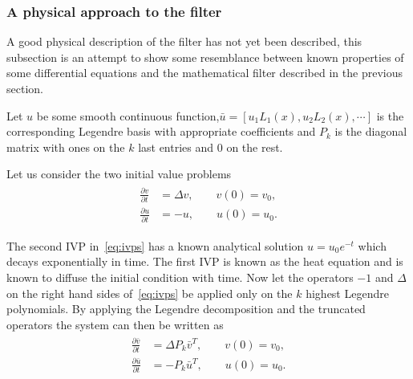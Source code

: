\subsubsection{A physical approach to the filter}
A good physical description of the filter has not yet been described, this 
subsection is an attempt to show some resemblance between known properties 
of some differential equations and the mathematical filter described in the previous section.

Let $u$ be some smooth continuous function,$\bar u = [u_1L_1(x),u_2L_2(x), \cdots]$
is the corresponding Legendre basis with 
appropriate coefficients
and $P_{k}$ is the diagonal matrix with ones on the $k$ last entries and $0$ on the rest.

Let us consider the two initial value problems 
\begin{align}
    \begin{split}
    \frac{\partial v }{\partial t} &= \Delta v, \qquad v(0) = v_0, \\
    \frac{\partial u }{\partial t} &= -u, \qquad u(0) = u_0.
    \end{split}
    \label{eq:ivps}
\end{align}

The second IVP in~\ref{eq:ivps} has a known analytical solution 
$u = u_0e^{-t}$ which decays exponentially in time. The first IVP is known 
as the heat equation and is known to diffuse the initial condition with time. 
Now let the operators $-1$ and $\Delta$ on the right hand sides of~\ref{eq:ivps}
be applied only on the $k$ highest Legendre polynomials. By applying the Legendre decomposition
and the truncated operators the system can then be written as 
\begin{align}
    \begin{split}
    \frac{\partial \bar v }{\partial t}
    &= \Delta P_{k}\bar v^T , \qquad v(0) = v_0, \\
        \frac{\partial \bar u }{\partial t} 
        &=   -P_{k}\bar u^T , \qquad u(0) = u_0.
    \label{eq:ivps2}
    \end{split}
\end{align}

